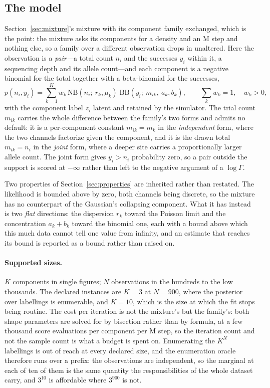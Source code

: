 \documentclass[11pt,a4paper]{article}
\begin{document}
\subsection{The model}
\label{sec:emissionmixture:model}
Section~\ref{sec:mixture}'s mixture with its component family exchanged, which
is the point: the mixture asks its components for a density and an M step and
nothing else, so a family over a different observation drops in unaltered. Here
the observation is a \emph{pair}---a total count
$n_i$ and the successes $y_i$ within it, a sequencing depth and its allele
count---and each component is a negative binomial for the total together with
a beta-binomial for the successes,
\begin{equation}
  p(n_i, y_i) = \sum_{k=1}^{K} w_k\,
    \mathrm{NB}(n_i;\ r_k, \mu_k)\;
    \mathrm{BB}(y_i;\ m_{ik},\ a_k, b_k),
  \qquad \sum_k w_k = 1,\quad w_k > 0 ,
  \label{eq:countpair}
\end{equation}
with the component label $z_i$ latent and retained by the simulator. The
trial count $m_{ik}$ carries the whole difference between the family's two
forms and admits no default: it is a per-component constant $m_{ik} = m_k$ in
the \emph{independent} form, where the two channels factorize given the
component, and it is the drawn total $m_{ik} = n_i$ in the \emph{joint} form,
where a deeper site carries a proportionally larger allele count. The joint
form gives $y_i > n_i$ probability zero, so a pair outside the support is
scored at $-\infty$ rather than left to the negative argument of a
$\log\Gamma$.

Two properties of Section~\ref{sec:properties} are inherited rather than
restated. The likelihood is bounded above by zero, both channels being
discrete, so the mixture has no counterpart of the Gaussian's collapsing
component. What it has instead is two \emph{flat} directions: the dispersion
$r_k$ toward the Poisson limit and the concentration $a_k + b_k$ toward the
binomial one, each with a bound above which this much data cannot tell one
value from infinity, and an estimate that reaches its bound is reported as a
bound rather than raised on.

\paragraph{Supported sizes.}
\label{par:emissionmixture:sizes}
$K$ components in single figures; $N$ observations in the hundreds to the
low thousands. The declared instances are $K = 3$ at $N = 900$, where the
posterior over labellings is enumerable, and $K = 10$, which is the size at
which the fit stops being routine. The cost per iteration is not the mixture's
but the family's: both shape parameters are solved for by bisection rather
than by formula, at a few thousand score evaluations per component per M step,
so the iteration count and not the sample count is what a budget is spent on.
Enumerating the $K^{N}$ labellings is out of reach at every declared size, and
the enumeration oracle therefore runs over a prefix: the observations are
independent, so the marginal at each of ten of them is the same quantity the
responsibilities of the whole dataset carry, and $3^{10}$ is affordable where
$3^{900}$ is not.
\end{document}
